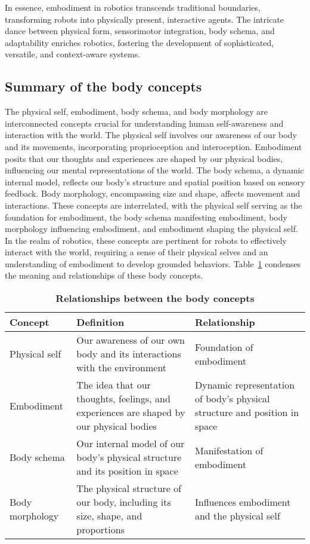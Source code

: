 In essence, embodiment in robotics transcends traditional boundaries, transforming robots into physically present, interactive agents. The intricate dance between physical form, sensorimotor integration, body schema, and adaptability enriches robotics, fostering the development of sophisticated, versatile, and context-aware systems.

\subsection{Summary of the body concepts}
The physical self, embodiment, body schema, and body morphology are interconnected concepts crucial for understanding human self-awareness and interaction with the world. The physical self involves our awareness of our body and its movements, incorporating proprioception and interoception. Embodiment posits that our thoughts and experiences are shaped by our physical bodies, influencing our mental representations of the world. The body schema, a dynamic internal model, reflects our body's structure and spatial position based on sensory feedback. Body morphology, encompassing size and shape, affects movement and interactions. These concepts are interrelated, with the physical self serving as the foundation for embodiment, the body schema manifesting embodiment, body morphology influencing embodiment, and embodiment shaping the physical self. In the realm of robotics, these concepts are pertinent for robots to effectively interact with the world, requiring a sense of their physical selves and an understanding of embodiment to develop grounded behaviors. Table~\ref{tab:body_concepts} condenses the meaning and relationships of these body concepts.

\begin{table}
\begin{center}
	\begin{tabular}{ |m{}|m{}|m{}| } 
		\hline
		\textbf{Concept} & \textbf{Definition} & \textbf{Relationship} \\ 
		\hline
		Physical self & Our awareness of our own body and its interactions with the environment & Foundation of embodiment \\ 
		\hline
		Embodiment & The idea that our thoughts, feelings, and experiences are shaped by our physical bodies & Dynamic representation of body's physical structure and position in space \\ 
		\hline
		Body schema	 & Our internal model of our body's physical structure and its position in space & Manifestation of embodiment \\ 
		\hline		
		Body morphology & The physical structure of our body, including its size, shape, and proportions & Influences embodiment and the physical self\\
		\hline
	\end{tabular}
\end{center}
\caption{\textbf{Relationships between the body concepts}}
\label{tab:body_concepts}
\end{table}
	



